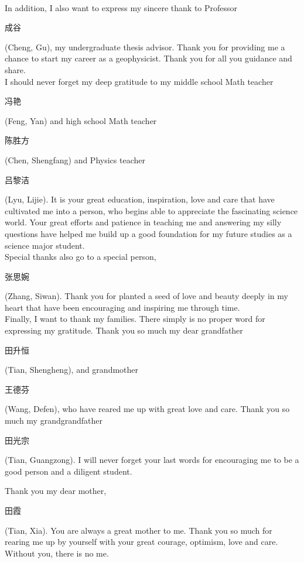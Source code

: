 \\
In addition, I also want to express my sincere thank to Professor \begin{CJK}{UTF8}{gbsn}成谷\end{CJK} (Cheng, Gu), my undergraduate thesis advisor. Thank you for providing me a chance to start my career as a geophysicist. Thank you for all you guidance and share. 
\\
I should never forget my deep gratitude to my middle school Math teacher \begin{CJK}{UTF8}{gbsn}冯艳\end{CJK} (Feng, Yan) and high school Math teacher \begin{CJK}{UTF8}{gbsn}陈胜方\end{CJK} (Chen, Shengfang) and Physics teacher \begin{CJK}{UTF8}{gbsn}吕黎洁\end{CJK} (Lyu, Lijie). It is your great education, inspiration, love and care that have cultivated me into a person, who begins able to appreciate the fascinating science world. Your great efforts and patience in teaching me and answering my silly questions have helped me build up a good foundation for my future studies as a science major student.
\\
Special thanks also go to a special person, \begin{CJK}{UTF8}{gbsn}张思婉\end{CJK} (Zhang, Siwan). Thank you for planted a seed of love and beauty deeply in my heart that have been encouraging and inspiring me through time.    
\\
Finally, I want to thank my families. There simply is no proper word for expressing my gratitude. Thank you so much my dear grandfather \begin{CJK}{UTF8}{gbsn}田升恒\end{CJK} (Tian, Shengheng), and grandmother \begin{CJK}{UTF8}{gbsn}王德芬\end{CJK} (Wang, Defen), who have reared me up with great love and care. Thank you so much my grandgrandfather \begin{CJK}{UTF8}{gbsn}田光宗\end{CJK} (Tian, Guangzong). I will never forget your last words for encouraging me to be a good person and a diligent student.

Thank you my dear mother, \begin{CJK}{UTF8}{gbsn}田霞\end{CJK} (Tian, Xia). You are always a great mother to me. Thank you so much for rearing me up by yourself with your great courage, optimism, love and care. Without you, there is no me.
